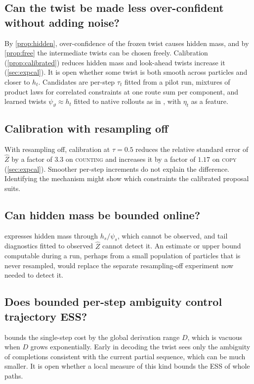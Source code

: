 \documentclass[11pt]{article}
\theoremstyle{definition}
\newcommand{\Zh}{\widehat Z}
\begin{document}
\subsection{Can the twist be made less over-confident without adding noise?}
By \cref{prop:hidden}, over-confidence of the frozen twist causes hidden mass, and by \cref{prop:free} the
intermediate twists can be chosen freely. Calibration (\cref{prop:calibrated}) reduces hidden mass and look-ahead
twists increase it (\cref{sec:expcal}). It is open whether some twist is both smooth across particles and closer
to $h_t$. Candidates are per-step $\tau_t$ fitted from a pilot run, mixtures of product laws for correlated
constraints at one route sum per component, and learned twists $\psi_\vartheta\approx h_t$ fitted to native
rollouts as in \cite{zhao2024}, with $\eta_t$ as a feature.

\subsection{Calibration with resampling off}
With resampling off, calibration at $\tau=0.5$ reduces the relative standard error of $\Zh$ by a factor of $3.3$
on \textsc{counting} and increases it by a factor of $1.17$ on \textsc{copy} (\cref{sec:expcal}). Smoother
per-step increments do not explain the difference. Identifying the mechanism might show which constraints the
calibrated proposal suits.

\subsection{Can hidden mass be bounded online?}
 expresses hidden mass through $h_s/\psi_s$, which cannot be observed, and tail diagnostics
fitted to observed $\Zh$ cannot detect it. An estimate or upper bound computable during a run, perhaps from a
small population of particles that is never resampled, would replace the separate resampling-off experiment now
needed to detect it.

\subsection{Does bounded per-step ambiguity control trajectory ESS?}
 bounds the single-step cost by the global derivation range $D$, which is vacuous when $D$ grows
exponentially. Early in decoding the twist sees only the ambiguity of completions consistent with the current
partial sequence, which can be much smaller. It is open whether a local measure of this kind bounds the ESS of
whole paths.
\end{document}
